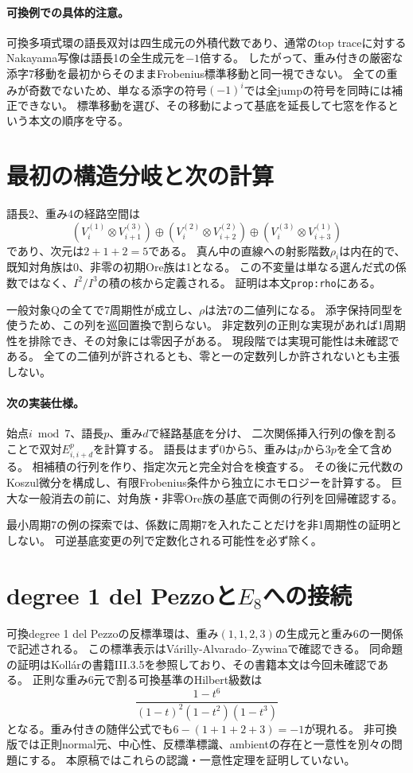 \documentclass[11pt,a4paper]{ltjsarticle}
\begin{document}
\paragraph{可換例での具体的注意。}
可換多項式環の語長双対は四生成元の外積代数であり、通常のtop traceに対する
Nakayama写像は語長1の全生成元を$-1$倍する。
したがって、重み付きの厳密な添字7移動を最初からそのままFrobenius標準移動と同一視できない。
全ての重みが奇数でないため、単なる添字の符号$(-1)^i$では全jumpの符号を同時には補正できない。
標準移動を選び、その移動によって基底を延長して七窓を作るという本文の順序を守る。

\section{最初の構造分岐と次の計算}
語長2、重み4の経路空間は
\[
(V_i^{(1)}\otimes V_{i+1}^{(3)})\oplus
(V_i^{(2)}\otimes V_{i+2}^{(2)})\oplus
(V_i^{(3)}\otimes V_{i+3}^{(1)})
\]
であり、次元は$2+1+2=5$である。
真ん中の直線への射影階数$\rho_i$は内在的で、
既知対角族は0、非零の初期Ore族は1となる。
この不変量は単なる選んだ式の係数ではなく、$I^2/I^3$の積の核から定義される。
証明は本文\texttt{prop:rho}にある。

一般対象Qの全てで7周期性が成立し、$\rho$は法7の二値列になる。
添字保持同型を使うため、この列を巡回置換で割らない。
非定数列の正則な実現があれば1周期性を排除でき、その対象には零因子がある。
現段階では実現可能性は未確認である。
全ての二値列が許されるとも、零と一の定数列しか許されないとも主張しない。

\paragraph{次の実装仕様。}
始点$i\bmod7$、語長$p$、重み$d$で経路基底を分け、
二次関係挿入行列の像を割ることで双対$E^p_{i,i+d}$を計算する。
語長はまず0から5、重みは$p$から$3p$を全て含める。
相補積の行列を作り、指定次元と完全対合を検査する。
その後に元代数のKoszul微分を構成し、有限Frobenius条件から独立にホモロジーを計算する。
巨大な一般消去の前に、対角族・非零Ore族の基底で両側の行列を回帰確認する。

最小周期7の例の探索では、係数に周期7を入れたことだけを非1周期性の証明としない。
可逆基底変更の列で定数化される可能性を必ず除く。

\section{degree 1 del Pezzoと\texorpdfstring{$E_8$}{E8}への接続}
可換degree 1 del Pezzoの反標準環は、重み$(1,1,2,3)$の生成元と重み6の一関係で記述される。
この標準表示はV\'arilly-Alvarado--Zywina\cite[Proposition 2.3]{VAZ}で確認できる。
同命題の証明はKoll\'arの書籍III.3.5を参照しており、その書籍本文は今回未確認である。
正則な重み6元で割る可換基準のHilbert級数は
\[
\frac{1-t^6}{(1-t)^2(1-t^2)(1-t^3)}
\]
となる。重み付きの随伴公式でも$6-(1+1+2+3)=-1$が現れる。
非可換版では正則normal元、中心性、反標準標識、ambientの存在と一意性を別々の問題にする。
本原稿ではこれらの認識・一意性定理を証明していない。
\end{document}
